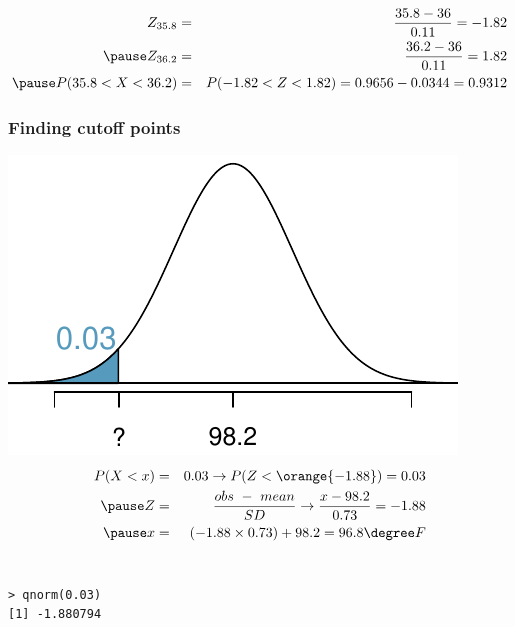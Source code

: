 \begin{frame}
{\begin{columns}[c]
\end{columns}
\pause
\begin{eqnarray*}
Z_{35.8} &=& \frac{35.8 - 36}{0.11} = -1.82 \\ \pause
Z_{36.2} &=& \frac{36.2 - 36}{0.11} = 1.82 \\ \pause
P(35.8 < X < 36.2) &=& P(-1.82 < Z < 1.82) = 0.9656 - 0.0344 = 0.9312
\end{eqnarray*}
}

\end{frame}


\begin{frame}[fragile]
\frametitle{Finding cutoff points}


\pause

{
\includegraphics[width=\textwidth]{4-1_normal_distribution/figures/temp/tempLOW3PERC}
}
{
\pause
\begin{eqnarray*}
P(X < x) &=& 0.03 \rightarrow P(Z < \orange{-1.88}) = 0.03 \\ \pause
Z &=& \frac{obs~-~mean}{SD} \rightarrow \frac{x - 98.2}{0.73} = -1.88 \\ \pause
x &=& (-1.88 \times 0.73) + 98.2 = 96.8\degree F
\end{eqnarray*}
}
$\:$ \\
\begin{beamerboxesrounded}[shadow = true, lower = code body]{}
{\small \begin{verbatim}
> qnorm(0.03)
[1] -1.880794
\end{verbatim}
}
\end{beamerboxesrounded}


\end{frame}

